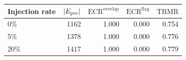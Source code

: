 \begin{tabular}{lrrrr}
\toprule
\textbf{Injection rate} & $|E_{\text{pre}}|$ & $\mathrm{ECR}^{\mathrm{overlap}}$ & $\mathrm{ECR}^{\mathrm{flag}}$ & $\mathrm{TBMR}$ \\
\midrule
0\% & 1162 & 1.000 & 0.000 & 0.754 \\
5\% & 1378 & 1.000 & 0.000 & 0.776 \\
20\% & 1417 & 1.000 & 0.000 & 0.779 \\
\bottomrule
\end{tabular}
